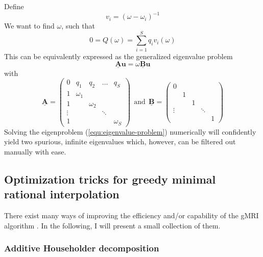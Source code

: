 \documentclass[11pt, a4paper]{article}
\begin{document}
Define
\begin{equation}
    v_i = (\omega - \omega_i)^{-1}
\end{equation}
We want to find $\omega$, such that
\begin{equation}
    0 = Q(\omega) = \sum_{i=1}^S q_i v_i(\omega)
\end{equation}
This can be equivalently expressed as the generalized eigenvalue problem
\begin{equation}
    \mathbf{\underline{A}} \mathbf{u} = \omega \mathbf{\underline{B}} \mathbf{u} \label{equ:eigenvalue-problem}
\end{equation}
with
\begin{equation}
    \mathbf{\underline{A}} = \begin{pmatrix}
        0 & q_1 & q_2 & \dots & q_S \\
        1 & \omega_1 & & & \\
        1 & & \omega_2 & & \\ 
        \vdots & & & \ddots & \\ 
        1 & & & & \omega_S
    \end{pmatrix} ~~\text{and}~~
    \mathbf{\underline{B}} = \begin{pmatrix}
        0 & & & & \\
         & 1 & & & \\
         & & 1 & & \\ 
        \vdots & & & \ddots & \\ 
         & & & & 1
    \end{pmatrix}\label{equ:root-finding}
\end{equation}
Solving the eigenproblem (\ref{equ:eigenvalue-problem}) numerically will confidently
yield two spurious, infinite eigenvalues which, however, can be filtered out
manually with ease.

\subsection{Optimization tricks for greedy minimal rational interpolation}
\label{subsec:optimization}

There exist many ways of improving the efficiency and/or capability of the
\acrshort{gMRI} algorithm \cite{davidePHD}. In the following, I will present
a small collection of them.

\subsubsection{Additive Householder decomposition}
\label{subsubsec:householder}
\end{document}
